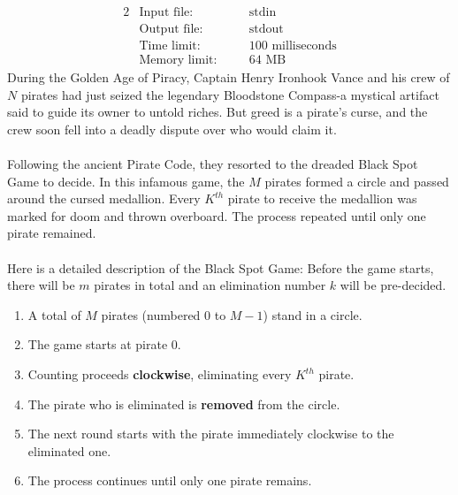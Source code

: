 \documentclass[12pt,a4paper]{article}
\begin{document}
\begin{alignat*} {2}
 &   \text{Input file:}   \quad     &&\text{stdin}\\
 &   \text{Output file:}  \quad     &&\text{stdout}\\
 &   \text{Time limit:}   \quad     &&\text{100 milliseconds}\\
 &   \text{Memory limit:} \quad     &&\text{64 MB}
\end{alignat*}
\noindent
During the Golden Age of Piracy, Captain Henry Ironhook Vance and his crew of \(N\) pirates had just seized the legendary Bloodstone Compass-a mystical artifact said to guide its owner to untold riches. 
But greed is a pirate's curse, and the crew soon fell into a deadly dispute over who would claim it.\\
\noindent\\
Following the ancient Pirate Code, they resorted to the dreaded Black Spot Game to decide. 
In this infamous game, the $M$ pirates formed a circle and passed around the cursed medallion. Every $K^{th}$ pirate to receive the medallion was marked for doom and thrown overboard.
The process repeated until only one pirate remained.\\
\noindent\\
Here is a detailed description of the Black Spot Game:
Before the game starts, there will be \(m\) pirates in total and an elimination number \(k\) will be pre-decided.
\begin{enumerate}
    \setlength{\itemsep}{-3pt} %
    \item A total of \(M\) pirates (numbered 0 to \(M-1\)) stand in a circle.
    \item The game starts at pirate 0.
    \item Counting proceeds \textbf{clockwise}, eliminating every \(K^{th}\) pirate.
    \item The pirate who is eliminated is \textbf{removed} from the circle.
    \item The next round starts with the pirate immediately clockwise to the eliminated one.
    \item The process continues until only one pirate remains.
\end{enumerate}
\end{document}
